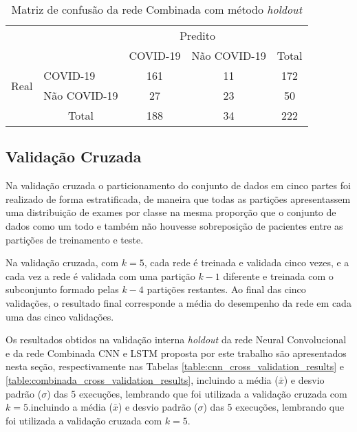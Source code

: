 
\begin{table}[h!]
\centering
\caption{Matriz de confusão da rede Combinada com método \textit{holdout}}
\label{tab:matriz_confusao_combinada_holdout_validation_results}
\begin{tabular}{l|l|c|c|c}
\multicolumn{2}{c}{}&\multicolumn{2}{c}{Predito}&\\
\cline{3-4}
\multicolumn{2}{c|}{}&COVID-19&Não COVID-19&\multicolumn{1}{c}{Total}\\
\cline{2-4}
\multirow{2}{*}{Real}& COVID-19 & 161 & 11 & 172\\
\cline{2-4}
& Não COVID-19 & 27 & 23 & 50\\
\cline{2-4}
\multicolumn{1}{c}{} & \multicolumn{1}{c}{Total} & \multicolumn{1}{c}{188} & \multicolumn{    1}{c}{34} & \multicolumn{1}{c}{222}\\
\end{tabular}
\end{table}


    
\subsection{Validação Cruzada}\label{subsec:cap_resultados_cross_validation}

Na validação cruzada o particionamento do conjunto de dados em cinco partes foi realizado de forma estratificada, de maneira que todas as partições apresentassem uma distribuição de exames por classe na mesma proporção que o conjunto de dados como um todo e também não houvesse sobreposição de pacientes entre as partições de treinamento e teste.

Na validação cruzada, com $k=5$, cada rede é treinada e validada cinco vezes, e a cada vez a rede é validada com uma partição $k-1$ diferente e treinada com o subconjunto formado pelas $k-4$ partições restantes. Ao final das cinco validações, o resultado final corresponde a média do desempenho da rede em cada uma das cinco validações. 

Os resultados obtidos na validação interna \textit{holdout} da rede Neural Convolucional e da rede Combinada CNN e LSTM proposta por este trabalho são apresentados nesta seção, respectivamente nas Tabelas \ref{table:cnn_cross_validation_results} e \ref{table:combinada_cross_validation_results}, incluindo a média ($\bar x$) e desvio padrão ($\sigma$) das 5 execuções, lembrando que foi utilizada a validação cruzada com $k=5$.incluindo a média ($\bar x$) e desvio padrão ($\sigma$) das 5 execuções, lembrando que foi utilizada a validação cruzada com $k=5$.

